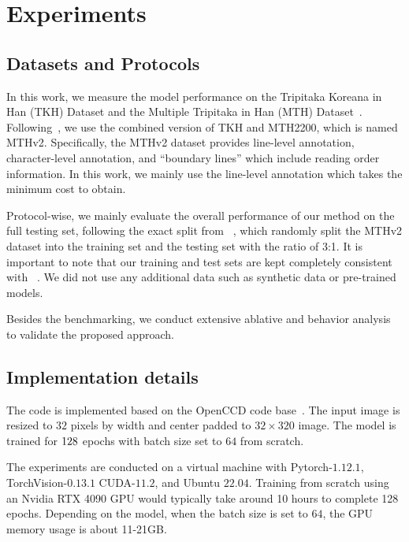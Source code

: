 \section{Experiments}

\subsection{Datasets and Protocols}
In this work, we measure the model performance on the Tripitaka Koreana in Han (TKH) Dataset and the Multiple Tripitaka in Han (MTH) Dataset~\cite{tkhmth}. Following~\cite{jla},
we use the combined version of TKH and MTH2200, which is named MTHv2. Specifically, the MTHv2 dataset provides line-level annotation, character-level annotation, and ``boundary lines'' which include reading order information. In this work, we mainly use the line-level annotation which takes the minimum cost to obtain. 

Protocol-wise, we mainly evaluate the overall performance of our method on the full testing set, following the exact split from ~\cite{jla}, which randomly split the MTHv2 dataset into the training set and the testing set with the ratio of 3:1. It is important to note that our training and test sets are kept completely consistent with ~\cite{jla}. We did not use any additional data such as synthetic data or pre-trained models.


Besides the benchmarking, we conduct extensive ablative and behavior analysis to validate the proposed approach.


\subsection{Implementation details}
The code is implemented based on the OpenCCD code base~\cite{vsdf}. The input image is resized to $32$ pixels by width and center padded to $32\times 320$ image. The model is trained for $128$ epochs with batch size set to $64$ from scratch. %

The experiments are conducted on a virtual machine with Pytorch-$1.12.1$, TorchVision-$0.13.1$ CUDA-$11.2$, and Ubuntu $22.04$. Training from scratch using an Nvidia RTX 4090 GPU would typically take around 10 hours to complete 128 epochs. Depending on the model, when the batch size is set to $64$, the GPU memory usage is about 11-21GB.


